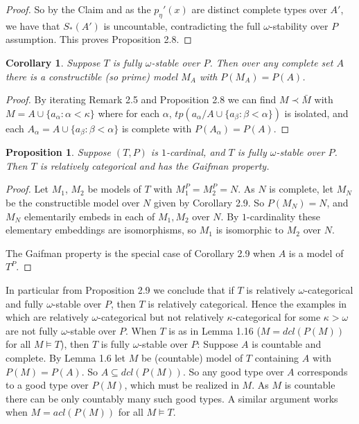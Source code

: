 \documentclass[12pt]{article}
\newtheorem{Proposition}[Theorem]{Proposition}
\newtheorem{Corollary}[Theorem]{Corollary}
\begin{document}
\begin{proof}
So by the Claim and as the $p_{\eta}'(x)$ are distinct complete types over $A'$, we have that $S_{*}(A')$ is uncountable, contradicting the full $\omega$-stability over $P$ assumption.
This proves Proposition 2.8. 

\end{proof} 

\begin{Corollary} Suppose $T$ is fully $\omega$-stable over $P$. Then over any complete set $A$ there is a constructible (so prime) model $M_{A}$ with $P(M_{A}) = P(A)$.
\end{Corollary}
\begin{proof} By iterating Remark 2.5 and Proposition 2.8 we can find $M\prec {\bar M}$ with $M = A\cup\{a_{\alpha}: \alpha < \kappa\}$ where for each $\alpha$, $tp(a_{\alpha}/A\cup \{a_{\beta}:\beta < \alpha\})$ is isolated, and each $A_{\alpha} = A\cup \{a_{\beta}: \beta <\alpha\}$ is complete with $P(A_{\alpha}) = P(A)$.

\end{proof}

\begin{Proposition} Suppose $(T,P)$ is $1$-cardinal, and $T$ is fully $\omega$-stable over $P$. Then $T$ is relatively categorical and has the Gaifman property.
\end{Proposition}
\begin{proof} Let $M_{1}$, $M_{2}$ be models of $T$ with $M_{1}^{P} = M_{2}^{P} = N$.  As $N$ is complete, let $M_{N}$ be the constructible model over $N$ given by Corollary 2.9. So $P(M_{N}) =N$, and $M_{N}$ elementarily embeds in each of $M_{1}, M_{2}$ over $N$. By $1$-cardinality these elementary embeddings are isomorphisms, so $M_{1}$ is isomorphic to $M_{2}$ over $N$. 

The Gaifman property is  the special case of Corollary 2.9 when $A$ is a model of $T^{P}$. 


\end{proof}

In particular from Proposition 2.9 we conclude that if $T$ is relatively $\omega$-categorical and fully $\omega$-stable over $P$, then $T$ is relatively categorical. Hence the examples in \cite{Hart-Shelah} which are relatively $\omega$-categorical but not relatively $\kappa$-categorical for some $\kappa > \omega$ are not fully $\omega$-stable over $P$. 
When  $T$ is as in Lemma 1.16 ($M = dcl(P(M))$ for all $M\models T$), then $T$ is fully $\omega$-stable over $P$:  Suppose $A$ is countable and complete. By Lemma 1.6 let $M$ be (countable) model of $T$ containing $A$ with $P(M) = P(A)$. So $A\subseteq dcl(P(M))$. So any good type over $A$ corresponds to a good type over $P(M)$, which must be realized in $M$. As $M$ is countable there can be only countably many such good types.
A similar argument works when $M = acl(P(M))$ for all $M\models T$.
\end{document}
